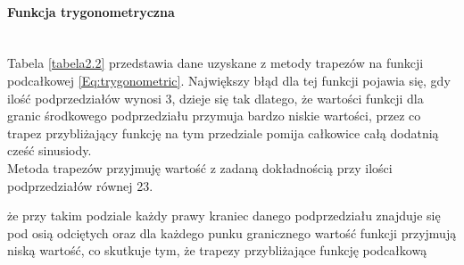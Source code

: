 \documentclass[12pt,twoside]{article}
\begin{document}
\paragraph{Funkcja trygonometryczna}\mbox{} \\

Tabela \eqref{tabela2.2} przedstawia dane uzyskane z metody trapezów na funkcji podcałkowej \eqref{Eq:trygonometric}. Największy błąd dla tej funkcji pojawia się, gdy ilość podprzedziałów wynosi 3, dzieje się tak dlatego, że wartości funkcji dla granic środkowego podprzedziału przymuja bardzo niskie wartości, przez co trapez przybliżający funkcję na tym przedziale pomija całkowice całą dodatnią cześć sinusiody.\\
Metoda trapezów przyjmuję wartość z zadaną dokładnością przy ilości podprzedziałów równej 23.

że przy takim podziale każdy prawy kraniec danego podprzedziału znajduje się pod osią odciętych oraz dla każdego punku granicznego wartość funkcji przyjmują niską wartość, co skutkuje tym, że trapezy przybliżające funkcję podcałkową 
\end{document}
